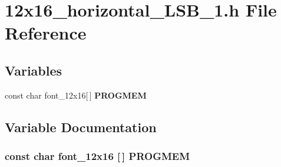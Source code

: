 \section{12x16\_\-horizontal\_\-LSB\_\-1.h File Reference}
\label{12x16__horizontal__LSB__1_8h}
\subsection*{Variables}
\begin{DoxyCompactItemize}
\item 
const char font\_\-12x16[$\,$] {\bf PROGMEM}
\end{DoxyCompactItemize}


\subsection{Variable Documentation}
\subsubsection[{PROGMEM}]{\setlength{\rightskip}{0pt plus 5cm}const char font\_\-12x16 [$\,$] {\bf PROGMEM}}\label{12x16__horizontal__LSB__1_8h_a3be0ed5f5cfb107eadc59d0b6b3771af}
